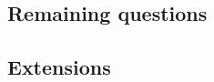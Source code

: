 \documentclass[11pt]{article} %
\begin{document}
\subsection{Remaining questions}
\label{sec:questions}
% 

\subsection{Extensions}
\label{sec:extensions}


\newpage 



\end{document}
